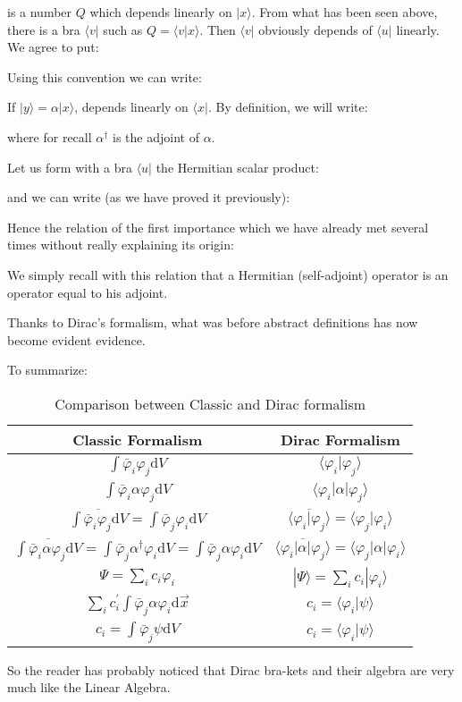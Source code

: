	is a number $Q$ which depends linearly on $|x\rangle$. From what has been seen above, there is a bra $\langle v|$ such as $Q=\langle v|x\rangle$. Then $\langle v|$ obviously depends of $\langle u|$ linearly. We agree to put:
	
	Using this convention we can write:
	
	If $|y\rangle=\alpha|x\rangle$, depends linearly on $\langle x|$. By definition, we will write:
	
	where for recall $\alpha^\dagger$ is the adjoint of $\alpha$.
	
	Let us form with a bra $\langle u|$ the Hermitian scalar product:
	
	and we can write (as we have proved it previously):
	
	Hence the relation of the first importance which we have already met several times without really explaining its origin:
	
	We simply recall with this relation that a Hermitian (self-adjoint) operator is an operator equal to his adjoint.

	Thanks to Dirac's formalism, what was before abstract definitions has now become evident evidence.

	To summarize:
	\setlength\extrarowheight{10pt}
	\begin{table}[H]
		\centering
		\begin{tabular}{|c|c|}
		\hline
		\rowcolor[HTML]{9B9B9B} 
		\textbf{Classic Formalism} & \textbf{Dirac Formalism} \\ \hline
		$\displaystyle\int \bar{\varphi}_i\varphi_j\mathrm{d}V$ &  $\langle \varphi_i | \varphi_j\rangle$\\ \hline
		$\displaystyle\int \bar{\varphi}_i\alpha\varphi_j\mathrm{d}V$ & $\langle \varphi_i | \alpha | \varphi_j\rangle$ \\ \hline
		$\overline{\displaystyle\int \bar{\varphi}_i\varphi_j\mathrm{d}V}=\displaystyle\int \bar{\varphi}_j\varphi_i\mathrm{d}V$ &  $\overline{\langle \varphi_i|\varphi_j\rangle}=\langle \varphi_j|\varphi_i\rangle$\\ \hline
		$\overline{\displaystyle\int \bar{\varphi}_i\alpha\varphi_j\mathrm{d}V}=\displaystyle\int \bar{\varphi}_j\alpha^\dagger\varphi_i\mathrm{d}V=\displaystyle\int\bar{\varphi}_j\alpha\varphi_i\mathrm{d}V$ &  $\overline{\langle \varphi_i|\alpha|\varphi_j\rangle}=\langle \varphi_j|\alpha|\varphi_i\rangle$\\ \hline
		$\Psi=\displaystyle\sum_i c_i\varphi_i$ & $|\Psi\rangle=\sum_i c_i|\varphi_i\rangle$\\ \hline
		$\displaystyle\sum_i c_i^{'}\displaystyle\int\bar{\varphi}_j\alpha\varphi_i\mathrm{d}\vec{x}$ & $c_i=\langle \varphi_i|\psi\rangle$ \\ \hline
		$c_i=\displaystyle\int\bar{\varphi}_j\psi\mathrm{d}V$ & $c_i=\langle \varphi_i |\psi\rangle$ \\ \hline
		\end{tabular}
		\caption{Comparison between Classic and Dirac formalism}
	\end{table}
	\setlength\extrarowheight{0pt}
	So the reader has probably noticed that Dirac bra-kets and their algebra are very much like the Linear Algebra.

